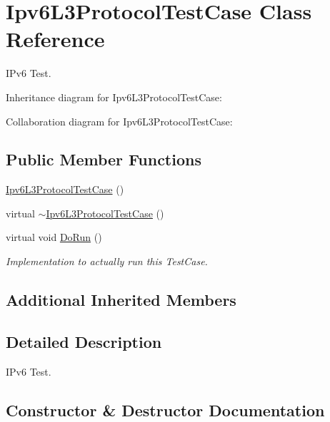 \hypertarget{classIpv6L3ProtocolTestCase}{}\section{Ipv6\+L3\+Protocol\+Test\+Case Class Reference}
\label{classIpv6L3ProtocolTestCase}


I\+Pv6 Test.  




Inheritance diagram for Ipv6\+L3\+Protocol\+Test\+Case\+:


Collaboration diagram for Ipv6\+L3\+Protocol\+Test\+Case\+:
\subsection*{Public Member Functions}
\begin{DoxyCompactItemize}
\item 
\hyperlink{classIpv6L3ProtocolTestCase_a3ab9dd63315a0827f199ed863ea311be}{Ipv6\+L3\+Protocol\+Test\+Case} ()
\item 
virtual \hyperlink{classIpv6L3ProtocolTestCase_aad4a4562846abcbf0e1cda35106039a9}{$\sim$\+Ipv6\+L3\+Protocol\+Test\+Case} ()
\item 
virtual void \hyperlink{classIpv6L3ProtocolTestCase_ac052c03e25689da8fed383146b988a7e}{Do\+Run} ()
\begin{DoxyCompactList}\small\item\em Implementation to actually run this Test\+Case. \end{DoxyCompactList}\end{DoxyCompactItemize}
\subsection*{Additional Inherited Members}


\subsection{Detailed Description}
I\+Pv6 Test. 

\subsection{Constructor \& Destructor Documentation}
